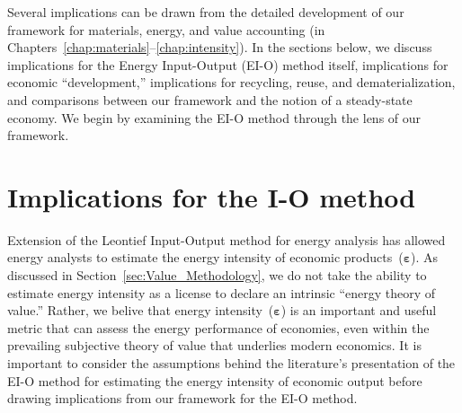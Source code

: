 

Several implications can be drawn from the detailed development 
of our framework for materials, energy, and value accounting 
(in Chapters~\ref{chap:materials}--\ref{chap:intensity}).
In the sections below, we discuss 
implications for the Energy Input-Output (EI-O) method itself,
implications for economic ``development,''
implications for recycling, reuse, and dematerialization, and
comparisons between our framework and the notion of a steady-state economy.
We begin by examining the EI-O method 
through the lens of our framework.


\section{Implications for the I-O method}
\label{sec:Implications_for_IO}

Extension of the Leontief 
Input-Output method
for energy analysis has allowed energy analysts to estimate 
the energy intensity
of economic products~($\boldsymbol{\varepsilon}$). 
As discussed in Section~\ref{sec:Value_Methodology},
we do not take the ability to estimate energy intensity as a license
to declare an intrinsic ``energy theory of value.''
Rather, we belive that energy intensity~($\boldsymbol{\varepsilon}$) is an 
important and useful metric that can assess 
the energy performance of economies,
even within the prevailing subjective theory of value
that underlies modern economics.
It is important to consider the assumptions behind
the literature's presentation of the EI-O method 
for estimating the energy intensity of economic output
before drawing implications from our framework 
for the EI-O method.

